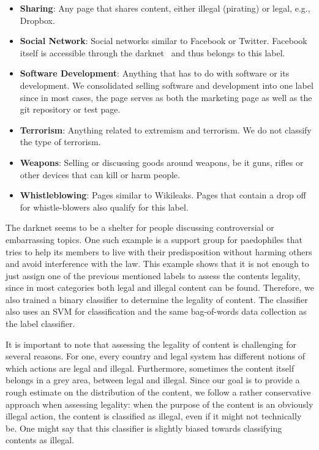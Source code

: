 \documentclass[USenglish,oneside,twocolumn]{article}
\begin{document}
\begin{itemize}
	\item \textbf{Sharing}: Any page that shares content, either illegal (pirating) or legal, e.g., Dropbox.
	\item \textbf{Social Network}: Social networks similar to Facebook or Twitter. Facebook itself is accessible through the darknet~\cite{facebook} and thus belongs to this label.
	\item \textbf{Software Development}: Anything that has to do with software or its development. We consolidated selling software and development into one label since in most cases, the page serves as both the marketing page as well as the git repository or test page.
	\item \textbf{Terrorism}: Anything related to extremism and terrorism. We do not classify the type of terrorism.
	\item \textbf{Weapons}: Selling or discussing goods around weapons, be it guns, rifles or other devices that can kill or harm people.
	\item \textbf{Whistleblowing}: Pages similar to Wikileaks. Pages that contain a drop off for whistle-blowers also qualify for this label.
\end{itemize}

The darknet seems to be a shelter for people discussing controversial or embarrassing topics. One such example is a support group for paedophiles that tries to help its members to live with their predisposition without harming others and avoid interference with the law. This example shows that it is not enough to just assign one of the previous mentioned labels to assess the contents legality, since in most categories both legal and illegal content can be found. Therefore, we also trained a binary classifier to determine the legality of content. The classifier also uses an SVM for classification and the same bag-of-words data collection as the label classifier.

It is important to note that assessing the legality of content is challenging for several reasons. For one, every country and legal system has different notions of which actions are legal and illegal.
Furthermore, sometimes the content itself belongs in a grey area, between legal and illegal. Since our goal is to provide a rough estimate on the distribution of the content, we follow a rather conservative approach when assessing legality: when the purpose of the content is an obviously illegal action, the content is classified as illegal, even if it might not technically be. One might say that this classifier is slightly biased towards classifying contents as illegal.
\end{document}

